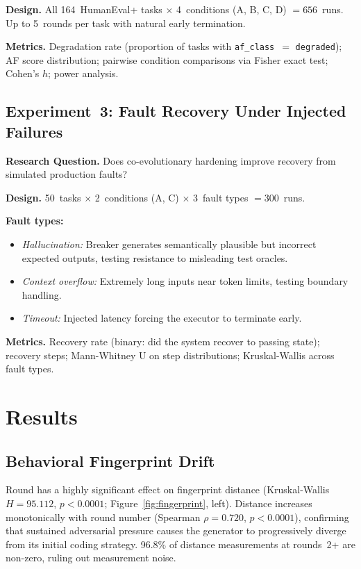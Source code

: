 \documentclass[11pt,letterpaper]{article}
\begin{document}
\textbf{Design.}
All 164~HumanEval+ tasks $\times$ 4~conditions (A, B, C, D) $= 656$~runs.
Up to 5~rounds per task with natural early termination.

\textbf{Metrics.}
Degradation rate (proportion of tasks with \texttt{af\_class}~$=$
\texttt{degraded}); AF score distribution; pairwise condition comparisons via
Fisher exact test; Cohen's $h$; power analysis.

\subsection{Experiment~3: Fault Recovery Under Injected Failures}

\textbf{Research Question.}
Does co-evolutionary hardening improve recovery from simulated production faults?

\textbf{Design.}
50~tasks $\times$ 2~conditions (A, C) $\times$ 3~fault types $= 300$~runs.

\textbf{Fault types:}
\begin{itemize}
  \item \emph{Hallucination:} Breaker generates semantically plausible but
        incorrect expected outputs, testing resistance to misleading test oracles.
  \item \emph{Context overflow:} Extremely long inputs near token limits, testing
        boundary handling.
  \item \emph{Timeout:} Injected latency forcing the executor to terminate early.
\end{itemize}

\textbf{Metrics.}
Recovery rate (binary: did the system recover to passing state); recovery steps;
Mann-Whitney U on step distributions; Kruskal-Wallis across fault types.

\section{Results}
\label{sec:results}

\subsection{Behavioral Fingerprint Drift}

Round has a highly significant effect on fingerprint distance
(Kruskal-Wallis $H = 95.112$, $p < 0.0001$; Figure~\ref{fig:fingerprint}, left).
Distance increases monotonically with round number (Spearman $\rho = 0.720$,
$p < 0.0001$), confirming that sustained adversarial pressure causes the generator
to progressively diverge from its initial coding strategy. 96.8\% of distance
measurements at rounds~2+ are non-zero, ruling out measurement noise.
\end{document}
